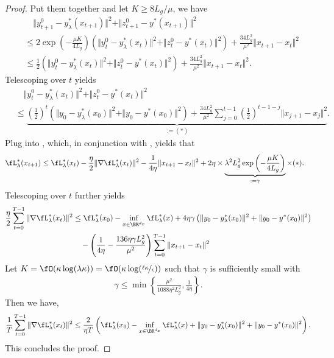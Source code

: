 \begin{proof}
Put them together and let $K \ge 8 L_g/ \mu$, we have
\begin{align} \label{eq:delta_t}
    &\quad \Vert y_{t+1}^0 - y_{\lambda}^*(x_{t+1}) \Vert^2  + \Vert z_{t+1}^0 - y^*(x_{t+1}) \Vert^2 \\
    &\le 2 \exp \left( - \frac{\mu K}{4 L_g} \right) \left(\Vert y_t^0 - y_{\lambda}^*(x_t) \Vert^2 + \Vert z_t^0 - y^*(x_t) \Vert^2 \right) +\frac{34 L_g^2}{\mu^2} \Vert x_{t+1} - x_t \Vert^2 \\
    &\le \frac{1}{2} \left(\Vert y_t^0 - y_{\lambda}^*(x_t) \Vert^2 + \Vert z_t^0 - y^*(x_t) \Vert^2 \right) +\frac{34 L_g^2}{\mu^2} \Vert x_{t+1} - x_t \Vert^2.
\end{align}
Telescoping over $t$ yields
\begin{align*}
    &\quad \Vert y_t^0 - y_{\lambda}^*(x_t) \Vert^2 + \Vert z_t^0 - y^*(x_t) \Vert^2 \\
    &\le \underbrace{\left( \frac{1}{2} \right)^t \left(\Vert y_0 - y_{\lambda}^*(x_0) \Vert^2 + \Vert y_0 - y^*(x_0) \Vert^2 \right) + \frac{34 L_g^2}{\mu^2} \sum_{j=0}^{t-1}  \left( \frac{1}{2}\right)^{t-1-j} \Vert x_{j+1} - x_j \Vert^2}_{:=(*)}.
\end{align*}
Plug into , which, in conjunction with , yields that
\begin{align*}
     \fL_{\lambda}^*(x_{t+1}) &\le \fL_{\lambda}^*(x_t) 
    - \frac{\eta}{2} \Vert \nabla \fL_{\lambda}^*(x_t) \Vert^2 - 
    \frac{1}{4\eta} \Vert x_{t+1} - x_{t} \Vert^2 + 2 \eta \times \underbrace{ \lambda^2 L_g^2 \exp \left( - \frac{\mu K}{4L_g}\right)}_{:=\gamma} \times (*).
\end{align*}
Telescoping over $t$ further yields
\begin{align} \label{eq:final}
\begin{split}
    \frac{\eta}{2}\sum_{t=0}^{T-1} \Vert \nabla \fL_{\lambda}^*(x_t) \Vert^2 &\le \fL_{\lambda}^*(x_0) - \inf_{x \in \BR^{d_x}} \fL_{\lambda}^*(x) + 4 \eta \gamma \left(\Vert y_0 - y_{\lambda}^*(x_0) \Vert^2 + \Vert y_0 - y^*(x_0) \Vert^2 \right) \\
    &\quad - \left( \frac{1}{4 \eta} - \frac{136 \eta \gamma L_g^2}{\mu^2} \right) \sum_{t=0}^{T-1} \Vert x_{t+1} - x_t \Vert^2
\end{split}
\end{align}
Let $K = \fO(\kappa \log(\lambda \kappa)) = \fO(\kappa \log(\nicefrac{\ell \kappa}{\epsilon}))$ such that $\gamma$ is sufficiently small with
\begin{align*}
    \gamma \le \min \left\{ \frac{\mu^2}{1088 \eta^2 L_g^2}, \frac{1}{4 \eta}\right\}.
\end{align*}
Then we have,
\begin{align*}
    \frac{1}{T} \sum_{t=0}^{T-1} \Vert \nabla \fL_{\lambda}^*(x_t) \Vert^2 \le  \frac{2}{\eta T} \left( \fL_{\lambda}^*(x_0) - \inf_{x \in \BR^{d_x}} \fL_{\lambda}^*(x) + \Vert y_0 - y_{\lambda}^*(x_0) \Vert^2 + \Vert y_0 - y^*(x_0) \Vert^2 \right).
\end{align*}
This concludes the proof.
\end{proof}

